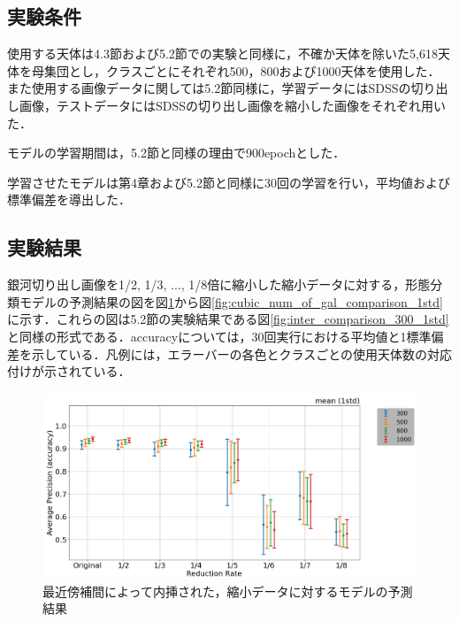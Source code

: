 \documentclass[a4j, 11pt]{jreport}
\begin{document}
\subsection{実験条件}
使用する天体は4.3節および5.2節での実験と同様に，不確か天体を除いた5,618天体を母集団とし，クラスごとにそれぞれ500，800および1000天体を使用した．
また使用する画像データに関しては5.2節同様に，学習データにはSDSSの切り出し画像，テストデータにはSDSSの切り出し画像を縮小した画像をそれぞれ用いた．

モデルの学習期間は，5.2節と同様の理由で900epochとした．

学習させたモデルは第4章および5.2節と同様に30回の学習を行い，平均値および標準偏差を導出した．


\subsection{実験結果}
銀河切り出し画像を1/2, 1/3, ..., 1/8倍に縮小した縮小データに対する，形態分類モデルの予測結果の図を図\ref{fig:nearest_num_of_gal_comparison_1std}から図\ref{fig:cubic_num_of_gal_comparison_1std}に示す．これらの図は5.2節の実験結果である図\ref{fig:inter_comparison_300_1std}と同様の形式である．accuracyについては，30回実行における平均値と1標準偏差を示している．凡例には，エラーバーの各色とクラスごとの使用天体数の対応付けが示されている．

\begin{figure}[H]
  \centering
  \includegraphics[width=1.0\hsize, keepaspectratio]{images/5syou/print_errorbar/nearest/acc_with_errorbar_syuron5_nearest_900epoch_30run_num_of_gal_comparison_acc_max_std1sigma.png}
  \caption{最近傍補間によって内挿された，縮小データに対するモデルの予測結果}
  \label{fig:nearest_num_of_gal_comparison_1std}
\end{figure}
\end{document}

